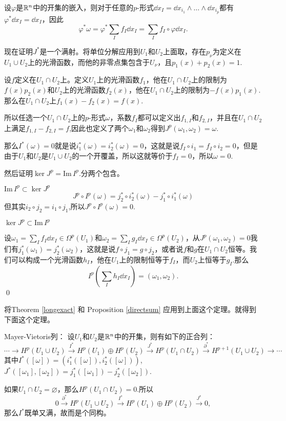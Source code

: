 设$\varphi$是$\mathbb{R}^n$中的开集的嵌入，则对于任意的$p$-形式$\dd x_I=\dd x_{i_1}\wedge\dots\wedge\dd x_{i_p}$都有$\varphi^* \dd x_I =\dd x_I$，因此
\[
\varphi^*\omega=\varphi^*\sum_If_I\dd x_I=\sum_If_I\circ\varphi \dd x_I.
\]

现在证明$J^*$是一个满射。将单位分解应用到$U_1$和$U_2$上面取，存在$p_\nu$为定义在$U_1\cup U_2$上的光滑函数，而他的非零点集包含于$U_\nu$，且$p_1(x)+p_2(x)=1$.

设$f$定义在$U_1\cap U_2$上。定义$U_1$上的光滑函数$f_1$，他在$U_1\cap U_2$上的限制为$f(x)p_2(x)$和$U_2$上的光滑函数$f_2(x)$，他在$U_1\cap U_2$上的限制为$-f(x)p_1(x)$.那么在$U_1\cap U_2$上$f_1(x)-f_2(x)=f(x)$.

所以任选一个$U_1\cap U_2$上的$p$-形式$\omega$，系数$f_I$都可以定义出$f_{1,I}$和$f_{2,I}$，并且在$U_1\cap U_2$上满足$f_{1,I}-f_{2,I}=f$,因此也定义了两个$\omega_1$和$\omega_2$得到$J^p(\omega_1,\omega_2)=\omega$.

那么$I^*(\omega)=0$就是说$i_1^*(\omega)=i_2^*(\omega)=0$，这就是说$f_I\circ i_1=f_I\circ i_2=0$，但是由于$U_1$和$U_2$是$U_1\cup U_2$的一个开覆盖，所以这就等价于$f_I=0$，所以$\omega=0$.

然后证明$\ker J^p=\mathrm{Im}\, I^p$.分两个包含。

 $\mathrm{Im}\, I^p\subset \ker J^p$
\[
J^p\circ I^p(\omega)=j_2^*\circ i_2^*(\omega)-j_1^*\circ i_1^*(\omega)
\]
但其实$i_2\circ j_2=i_1\circ j_1$,所以$J^p\circ I^p(\omega)=0$.

 $\ker J^p\subset \mathrm{Im}\, I^p$

设$\omega_1=\sum_I f_I \dd x_I\in \Omega^p(U_1)$和$\omega_2=\sum_I g_I \dd x_I\in \Omega^p(U_2)$，从$J^p(\omega_1,\omega_2)=0$我们有$j_1^*(\omega_1)=j_2^*(\omega_2)$，这就是说$f\circ j_1=g\circ j_2$，或者说$f$和$g$在$U_1\cap U_2$恒等。我们可以构成一个光滑函数$h_I$，他在$U_1$上的限制恒等于$f_I$，而$U_2$上恒等于$g_I$.那么
\[
I^p\left(\sum_Ih_I\dd x_I\right)=(\omega_1,\omega_2).
\]\qed

将Theorem \eqref{longexact} 和 Proposition \eqref{directsum} 应用到上面这个定理。就得到下面这个定理。

\theo Mayer-Vietoris列：
设$U_1$和$U_2$是$\mathbb{R}^n$中的开集，则有如下的正合列：
\[
\cdots\to H^p(U_1\cup U_2)\xrightarrow{I^*}H^p(U_1)\oplus H^p(U_2)\xrightarrow{J^*}H^p(U_1\cap U_2)\xrightarrow{\partial^*}H^{p+1}(U_1\cup U_2)
\to \cdots
\]
其中$I^*([\omega])=(i_1^*([\omega]),i_2^*([\omega]))$,$J^*([\omega_1],[\omega_2])=j_1^*([\omega_1])-j_2^*([\omega_2])$.

如果$U_1\cap U_2=\varnothing$，那么$H^p(U_1\cap U_2)=0$.所以
\[
0\xrightarrow{\partial^*} H^p(U_1\cup U_2)\xrightarrow{I^*}H^p(U_1)\oplus H^p(U_2)\xrightarrow{J^*}0,
\]
那么$I^*$既单又满，故而是个同构。


